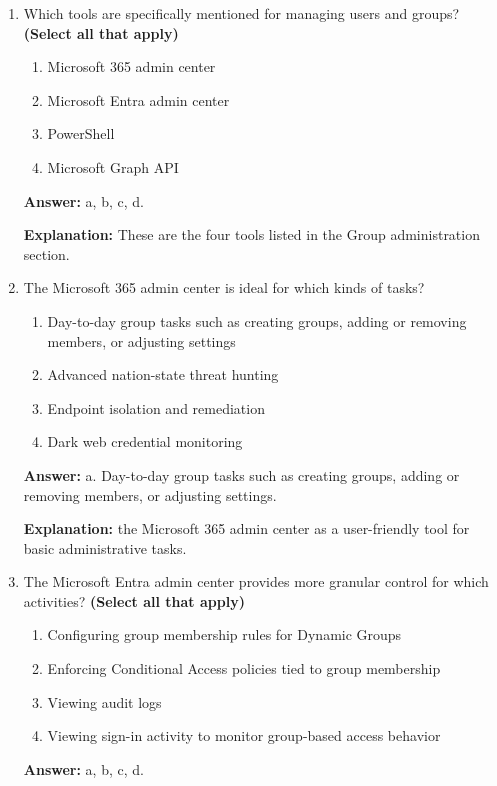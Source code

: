 \documentclass[10pt]{article}
\begin{document}
\begin{enumerate}[leftmargin=*]
\textbf{Explanation:} This is the exact dynamic group example used in the documentation.

\item Which tools are specifically mentioned for managing users and groups? \textbf{(Select all that apply)}
\begin{enumerate}[label=\alph*., leftmargin=1.5em]
\item Microsoft 365 admin center
\item Microsoft Entra admin center
\item PowerShell
\item Microsoft Graph API
\end{enumerate}
\textbf{Answer:} a, b, c, d.

\textbf{Explanation:} These are the four tools listed in the Group administration section.

\item The Microsoft 365 admin center is ideal for which kinds of tasks?
\begin{enumerate}[label=\alph*., leftmargin=1.5em]
\item Day-to-day group tasks such as creating groups, adding or removing members, or adjusting settings
\item Advanced nation-state threat hunting
\item Endpoint isolation and remediation
\item Dark web credential monitoring
\end{enumerate}
\textbf{Answer:} a. Day-to-day group tasks such as creating groups, adding or removing members, or adjusting settings.

\textbf{Explanation:} the Microsoft 365 admin center as a user-friendly tool for basic administrative tasks.

\item The Microsoft Entra admin center provides more granular control for which activities? \textbf{(Select all that apply)}
\begin{enumerate}[label=\alph*., leftmargin=1.5em]
\item Configuring group membership rules for Dynamic Groups
\item Enforcing Conditional Access policies tied to group membership
\item Viewing audit logs
\item Viewing sign-in activity to monitor group-based access behavior
\end{enumerate}
\textbf{Answer:} a, b, c, d.


\end{enumerate}
\end{document}
